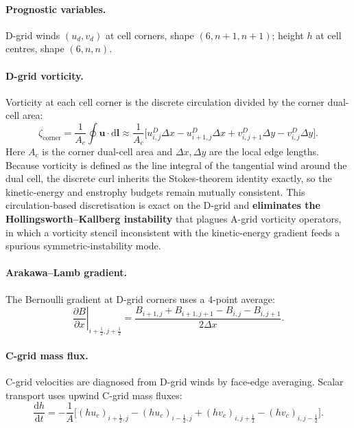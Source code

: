 \documentclass[11pt,twoside]{report}
\newcommand{\dd}{\mathrm{d}}
\newcommand{\pp}{\partial}
\newcommand{\half}{\tfrac{1}{2}}
\newcommand{\vect}[1]{\bm{#1}}
\begin{document}
\paragraph{Prognostic variables.}
D-grid winds $(u_d,v_d)$ at cell corners, shape $(6,n\!+\!1,n\!+\!1)$;
height $h$ at cell centres, shape $(6,n,n)$.

\paragraph{D-grid vorticity.}
Vorticity at each cell corner is the discrete circulation divided by the
corner dual-cell area:
\begin{equation}
  \zeta_{\mathrm{corner}} = \frac{1}{A_c}\oint\vect{u}\cdot\dd\vect{l}
  \approx \frac{1}{A_c}\bigl[u^D_{i,j}\Delta x - u^D_{i+1,j}\Delta x
  + v^D_{i,j+1}\Delta y - v^D_{i,j}\Delta y\bigr].
\end{equation}
Here $A_c$ is the corner dual-cell area and $\Delta x,\Delta y$ are the local
edge lengths. Because vorticity is defined as the line integral of the
tangential wind around the dual cell, the discrete curl inherits the
Stokes-theorem identity exactly, so the kinetic-energy and enstrophy budgets
remain mutually consistent. This circulation-based discretisation is exact on
the D-grid and \textbf{eliminates the Hollingsworth--Kallberg instability} that
plagues A-grid vorticity operators, in which a vorticity stencil inconsistent
with the kinetic-energy gradient feeds a spurious symmetric-instability mode.

\paragraph{Arakawa--Lamb gradient.}
The Bernoulli gradient at D-grid corners uses a 4-point average:
\begin{equation}
  \left.\frac{\pp B}{\pp x}\right|_{i+\half,j+\half}
  = \frac{B_{i+1,j}+B_{i+1,j+1}-B_{i,j}-B_{i,j+1}}{2\Delta x}.
\end{equation}

\paragraph{C-grid mass flux.}
C-grid velocities are diagnosed from D-grid winds by face-edge averaging.
Scalar transport uses upwind C-grid mass fluxes:
\begin{equation}
  \frac{\dd h}{\dd t} = -\frac{1}{A}
  \bigl[(hu_c)_{i+\half,j}-(hu_c)_{i-\half,j}
  +(hv_c)_{i,j+\half}-(hv_c)_{i,j-\half}\bigr].
\end{equation}
\end{document}
